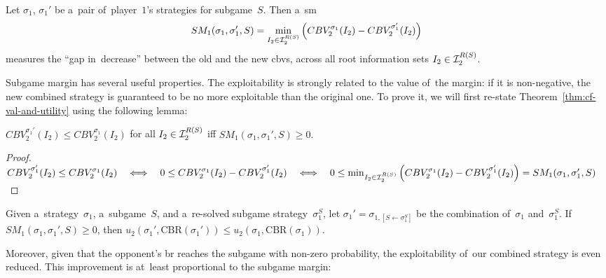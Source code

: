 \begin{framed}
  \begin{defn}[\acrlong{sm}]
    Let $\sigma_1$, $\sigma_1'$ be a~pair of~player~$1$'s strategies for subgame~$S$.
    Then a~\acrlong{sm}
    \[
      SM_1 (\sigma_1, \sigma_1' , S) =
      \min_{I_2 \in \mathcal{I}_2^{R(S)}}
      \left( CBV_2^{\sigma_1} (I_2) - CBV_2^{\sigma_1'} (I_2) \right)
    \]
    measures the ``gap in~decrease'' between the old and the new \acrlong{cbv}s, across all root information sets $I_2 \in \mathcal{I}_2^{R(S)}$.
  \end{defn}
\end{framed}

Subgame margin has several useful properties.
The exploitability is strongly related to the value of~the margin:
if it is non-negative, the new combined strategy is guaranteed to be no more exploitable than the original one.
To prove it, we will first re-state Theorem~\ref{thm:cf-val-and-utility} using the following lemma:
\begin{lem}
  \label{lem:cbv-and-sm}
  $CBV_2^{\sigma_1'} (I_2) \leq CBV_2^{\sigma_1} (I_2)$ for all $I_2 \in \mathcal{I}_2^{R(S)}$
  iff
  $SM_1 (\sigma_1, \sigma_1' , S) \geq 0.$
\end{lem}
\begin{proof}
  $
  CBV_2^{\sigma_1'} (I_2) \leq CBV_2^{\sigma_1} (I_2)
  \quad \Longleftrightarrow \quad
  0 \leq CBV_2^{\sigma_1} (I_2) - CBV_2^{\sigma_1'} (I_2)
  \quad \Longleftrightarrow \quad
  0 \leq \min_{I_2 \in \mathcal{I}_2^{R(S)}} \left( CBV_2^{\sigma_1} (I_2) - CBV_2^{\sigma_1'} (I_2) \right)
  = SM_1 (\sigma_1, \sigma_1' , S)
  $
\end{proof}

\begin{cor}
  \label{cor:sm-and-utility}
  Given a~strategy~$\sigma_1$, a~subgame~$S$, and a~re-solved subgame strategy~$\sigma_1^S$, let $\sigma_1' = \sigma_{1, [S \leftarrow \sigma_1^S]}$ be the combination of~$\sigma_1$ and~$\sigma_1^S$.
  If $SM_1 (\sigma_1, \sigma_1' , S) \geq 0$, then $u_2(\sigma_1', \textrm{CBR}(\sigma_1')) \leq  u_2(\sigma_1, \textrm{CBR}(\sigma_1))$.
\end{cor}

Moreover, given that the opponent's \acrlong{br} reaches the subgame with non-zero probability, the exploitability of~our combined strategy is even reduced.
This improvement is at~least proportional to the subgame margin:

